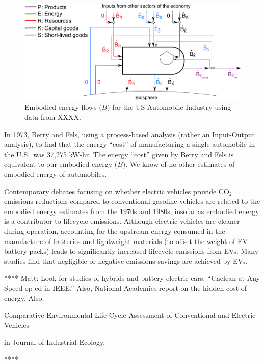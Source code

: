 \begin{figure}[!ht]
\centering
\includegraphics[width=0.8\linewidth]{Part_1/Chapter_Embodied/images/PERKS_basic_unit_embodied_energy_content_auto_ind.pdf}
\caption[Embodied energy flows for the US Automobile Industry]{Embodied energy flows ($\dot{B}$) for the US Automobile Industry using data from XXXX.}
\label{fig:PERKS_embodied_auto}
\end{figure}

In 1973, Berry and Fels, using a process-based analysis 
(rather an Input-Output analysis),
to find that the energy ``cost'' of manufacturing a single automobile 
in the U.S.\ was 37,275 kW-hr.\cite[Table~2]{Berry:1973vo}
The energy ``cost'' given by Berry and Fels is equivalent
to our embodied energy ($B$). 
We know of no other estimates of embodied energy of automobiles.

Contemporary debates focusing on whether 
electric vehicles provide CO$_2$ emissions reductions
compared to conventional gasoline vehicles
are related to the embodied energy estimates from the 1970s and 1980s,
insofar as embodied energy
is a contributor to lifecycle emissions.
Although electric vehicles are cleaner during operation,
accounting for the upstream energy consumed in the manufacture
of batteries and lightweight materials 
(to offset the weight of EV battery packs)
leads to significantly increased lifecycle emissions from EVs.
Many studies find that negligible or negative emissions
savings are achieved by EVs.

**** Matt: Look for studies of hybrids and battery-electric cars. 
``Unclean at Any Speed op-ed in IEEE.'' Also, National Academies report 
on the hidden cost of energy. 
Also:

Comparative Environmental Life Cycle Assessment of Conventional and Electric Vehicles

in Journal of Industrial Ecology. 

****





